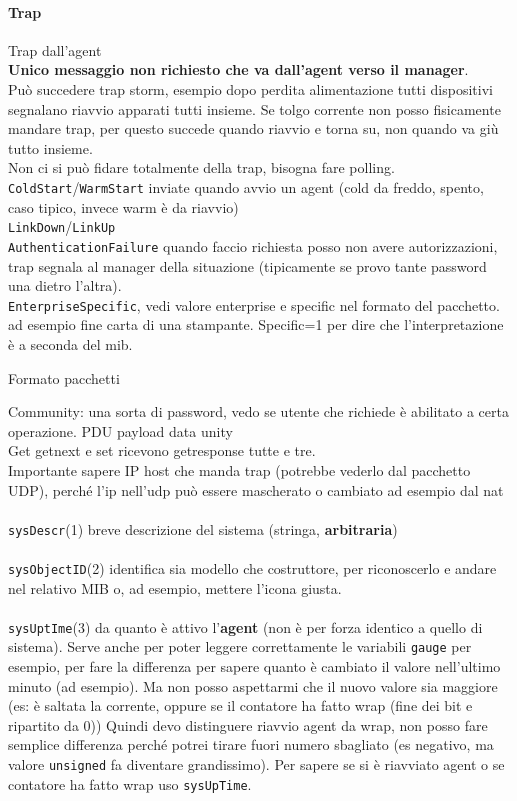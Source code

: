 \documentclass[10pt]{book}
\begin{document}
\paragraph{Trap} Trap dall'agent\\
\textbf{Unico messaggio non richiesto che va dall'agent verso il manager}.\\
Può succedere trap storm, esempio dopo perdita alimentazione tutti dispositivi segnalano riavvio apparati tutti insieme. Se tolgo corrente non posso fisicamente mandare trap, per questo succede quando riavvio e torna su, non quando va giù tutto insieme.\\
Non ci si può fidare totalmente della trap, bisogna fare polling.\\
\texttt{ColdStart}/\texttt{WarmStart} inviate quando avvio un agent (cold da freddo, spento, caso tipico, invece warm è da riavvio)\\
\texttt{LinkDown}/\texttt{LinkUp}\\
\texttt{AuthenticationFailure} quando faccio richiesta posso non avere autorizzazioni, trap segnala al manager della situazione (tipicamente se provo tante password una dietro l'altra).\\
\texttt{EnterpriseSpecific}, vedi valore enterprise e specific nel formato del pacchetto. ad esempio fine carta di una stampante. Specific=1 per dire che l'interpretazione è a seconda del mib.
\begin{center}
	Formato pacchetti
\end{center}
Community: una sorta di password, vedo se utente che richiede è abilitato a certa operazione. PDU payload data unity\\
Get getnext e set ricevono getresponse tutte e tre.\\
Importante sapere IP host che manda trap (potrebbe vederlo dal pacchetto UDP), perché l'ip nell'udp può essere mascherato o cambiato ad esempio dal nat\\\\
\texttt{sysDescr}(1) breve descrizione del sistema (stringa, \textbf{arbitraria})\\\\
\texttt{sysObjectID}(2) identifica sia modello che costruttore, per riconoscerlo e andare nel relativo MIB o, ad esempio, mettere l'icona giusta.\\\\
\texttt{sysUptIme}(3) da quanto è attivo l'\textbf{agent} (non è per forza identico a quello di sistema). Serve anche per poter leggere correttamente le variabili \texttt{gauge} per esempio, per fare la differenza per sapere quanto è cambiato il valore nell'ultimo minuto (ad esempio). Ma non posso aspettarmi che il nuovo valore sia maggiore (es: è saltata la corrente, oppure se il contatore ha fatto wrap (fine dei bit e ripartito da 0)) Quindi devo distinguere riavvio agent da wrap, non posso fare semplice differenza perché potrei tirare fuori numero sbagliato (es negativo, ma valore \texttt{unsigned} fa diventare grandissimo). Per sapere se si è riavviato agent o se contatore ha fatto wrap uso \texttt{sysUpTime}.
\end{document}
